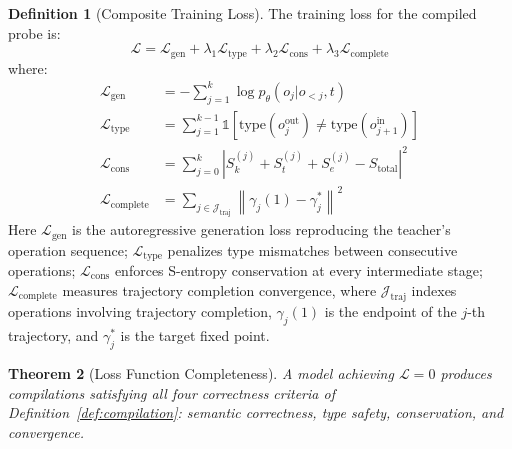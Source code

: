 \documentclass[11pt,twocolumn,a4paper]{article}
\newtheorem{theorem}{Theorem}[section]
\theoremstyle{definition}
\newtheorem{definition}[theorem]{Definition}
\theoremstyle{remark}
\newcommand{\Sk}{S_k}
\newcommand{\St}{S_t}
\newcommand{\Se}{S_e}
\newcommand{\loss}{\mathcal{L}}
\newcommand{\params}{\theta}
\begin{document}
\begin{definition}[Composite Training Loss]
\label{def:composite_loss}
The training loss for the compiled probe is:
\begin{equation}
\loss = \loss_{\mathrm{gen}} + \lambda_1 \loss_{\mathrm{type}} + \lambda_2 \loss_{\mathrm{cons}} + \lambda_3 \loss_{\mathrm{complete}}
\end{equation}
where:
\begin{align}
\loss_{\mathrm{gen}} &= -\sum_{j=1}^{k} \log p_\params(o_j | o_{<j}, t) \label{eq:loss_gen} \\
\loss_{\mathrm{type}} &= \sum_{j=1}^{k-1} \mathbb{1}[\text{type}(o_j^{\text{out}}) \neq \text{type}(o_{j+1}^{\text{in}})] \label{eq:loss_type} \\
\loss_{\mathrm{cons}} &= \sum_{j=0}^{k} \left| \Sk^{(j)} + \St^{(j)} + \Se^{(j)} - S_{\mathrm{total}} \right|^2 \label{eq:loss_cons} \\
\loss_{\mathrm{complete}} &= \sum_{j \in \mathcal{J}_{\text{traj}}} \left\| \gamma_j(1) - \gamma_j^* \right\|^2 \label{eq:loss_complete}
\end{align}
Here $\loss_{\mathrm{gen}}$ is the autoregressive generation loss reproducing the teacher's operation sequence; $\loss_{\mathrm{type}}$ penalizes type mismatches between consecutive operations; $\loss_{\mathrm{cons}}$ enforces S-entropy conservation at every intermediate stage; $\loss_{\mathrm{complete}}$ measures trajectory completion convergence, where $\mathcal{J}_{\text{traj}}$ indexes operations involving trajectory completion, $\gamma_j(1)$ is the endpoint of the $j$-th trajectory, and $\gamma_j^*$ is the target fixed point.
\end{definition}

\begin{theorem}[Loss Function Completeness]
\label{thm:loss_completeness}
A model achieving $\loss = 0$ produces compilations satisfying all four correctness criteria of Definition~\ref{def:compilation}: semantic correctness, type safety, conservation, and convergence.
\end{theorem}
\end{document}

